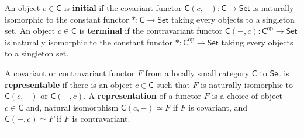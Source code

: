 \begin{defn} An object $c\in\mathsf{C}$ is \textbf{initial} if the covariant functor $\mathsf{C}(c,-):\mathsf{C}\rightarrow \mathsf{Set}$ is naturally isomorphic to the constant functor $*:\mathsf{C}\rightarrow \mathsf{Set}$ taking every objects to a singleton set. An object $c\in \mathsf{C}$ is \textbf{terminal} if the contravariant functor $\mathsf{C}(-,c):\mathsf{C}^{\textrm{op}}\rightarrow\mathsf{Set}$ is naturally isomorphic to the constant functor $*:\mathsf{C}^{\textrm{op}}\rightarrow \mathsf{Set}$ taking every objects to a singleton set.
\end{defn}

\begin{defn} A covariant or contravariant functor $F$ from a locally small category $\mathsf{C}$ to $\mathsf{Set}$ is \textbf{representable} if there is an object $c\in \mathsf{C}$ such that $F$ is naturally isomorphic to $\mathsf{C}(c,-)$ or $\mathsf{C}(-,c)$. A \textbf{representation} of a functor $F$ is a choice of object $c\in\mathsf{C}$ and, natural isomorphism $\mathsf{C}(c,-)\simeq F$ if $F$ is covariant, and $\mathsf{C}(-,c)\simeq F$ if $F$ is contravariant.
\end{defn}
\noindent\rule{\textwidth}{1pt}
\newline